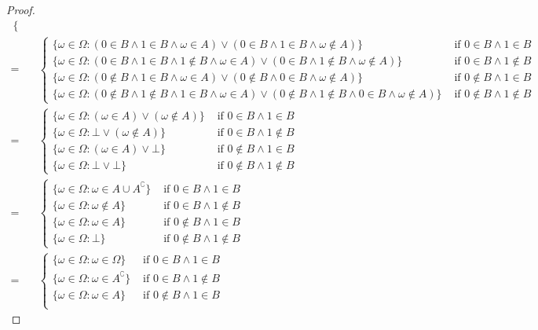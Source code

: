 \documentclass{article}
\begin{document}
\begin{proof}
\begin{align*}
\begin{cases}
    \end{cases} \\
    =& \begin{cases}
    \{\omega\in\Omega:(0\in B \wedge 1\in B\wedge \omega\in A)\vee (0\in B\wedge 1\in B\wedge \omega \notin A)\}&\text{ if }0\in B\wedge 1\in B\\
    \{\omega\in\Omega:(0\in B \wedge 1\in B\wedge1\notin B\wedge \omega\in A)\vee (0\in B\wedge 1\notin B\wedge \omega \notin A)\}&\text{ if }0\in B\wedge 1\notin B\\
    \{\omega\in\Omega:(0\notin B\wedge 1\in B\wedge \omega\in A)\vee (0\notin B \wedge 0\in B\wedge \omega \notin A)\}&\text{ if }0\notin B\wedge 1\in B\\
    \{\omega\in\Omega:(0\notin B\wedge 1\notin B \wedge 1\in B\wedge \omega\in A)\vee (0\notin B\wedge 1\notin B \wedge 0\in B\wedge \omega \notin A)\}&\text{ if }0\notin B\wedge 1\notin B
    \end{cases} \\
    =& \begin{cases}
    \{\omega\in\Omega:(\omega\in A)\vee (\omega \notin A)\}&\text{ if }0\in B\wedge 1\in B\\
    \{\omega\in\Omega:\bot\vee (\omega \notin A)\}&\text{ if }0\in B\wedge 1\notin B\\
    \{\omega\in\Omega:(\omega\in A)\vee \bot\}&\text{ if }0\notin B\wedge 1\in B\\
    \{\omega\in\Omega:\bot\vee \bot\}&\text{ if }0\notin B\wedge 1\notin B
    \end{cases} \\
    =& \begin{cases}
    \{\omega\in\Omega:\omega\in A\cup A^\complement\}&\text{ if }0\in B\wedge 1\in B\\
    \{\omega\in\Omega:\omega \notin A\}&\text{ if }0\in B\wedge 1\notin B\\
    \{\omega\in\Omega:\omega\in A\}&\text{ if }0\notin B\wedge 1\in B\\
    \{\omega\in\Omega:\bot\}&\text{ if }0\notin B\wedge 1\notin B
    \end{cases} \\
    =& \begin{cases}
    \{\omega\in\Omega:\omega\in \Omega\}&\text{ if }0\in B\wedge 1\in B\\
    \{\omega\in\Omega:\omega \in A^\complement\}&\text{ if }0\in B\wedge 1\notin B\\
    \{\omega\in\Omega:\omega\in A\}&\text{ if }0\notin B\wedge 1\in B\\

\end{cases}
\end{align*}
\end{proof}
\end{document}
